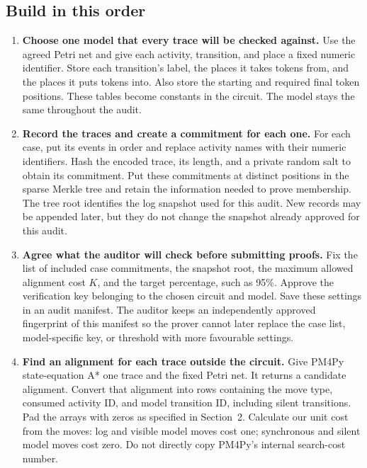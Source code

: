 \documentclass[10pt,a4paper]{article}
\newcommand{\must}[1]{\textbf{#1}}
\begin{document}
\subsection*{Build in this order}
\begin{enumerate}

\item \must{Choose one model that every trace will be checked against.}
Use the agreed Petri net and give each activity, transition, and place a fixed numeric identifier. Store each transition's label, the places it takes tokens from, and the places it puts tokens into. Also store the starting and required final token positions. These tables become constants in the circuit. The model stays the same throughout the audit.

\item \must{Record the traces and create a commitment for each one.}
For each case, put its events in order and replace activity names with their numeric identifiers. Hash the encoded trace, its length, and a private random salt to obtain its commitment. Put these commitments at distinct positions in the sparse Merkle tree and retain the information needed to prove membership. The tree root identifies the log snapshot used for this audit. New records may be appended later, but they do not change the snapshot already approved for this audit.

\item \must{Agree what the auditor will check before submitting proofs.}
Fix the list of included case commitments, the snapshot root, the maximum allowed alignment cost $K$, and the target percentage, such as 95\%. Approve the verification key belonging to the chosen circuit and model. Save these settings in an audit manifest. The auditor keeps an independently approved fingerprint of this manifest so the prover cannot later replace the case list, model-specific key, or threshold with more favourable settings.

\item \must{Find an alignment for each trace outside the circuit.}
Give PM4Py state-equation A* one trace and the fixed Petri net. It returns a candidate alignment. Convert that alignment into rows containing the move type, consumed activity ID, and model transition ID, including silent transitions. Pad the arrays with zeros as specified in Section~2. Calculate our unit cost from the moves: log and visible model moves cost one; synchronous and silent model moves cost zero. Do not directly copy PM4Py's internal search-cost number.


\end{enumerate}
\end{document}
